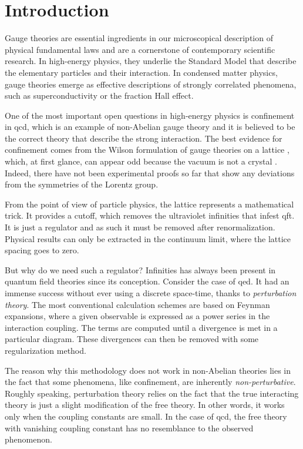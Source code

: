 \newpage

\chapter*{Introduction}
\label{chap:introduction}

Gauge theories are essential ingredients in our microscopical description of physical fundamental laws and are a cornerstone of contemporary scientific research.
In high-energy physics, they underlie the Standard Model that describe the elementary particles and their interaction.
In condensed matter physics, gauge theories emerge as effective descriptions of strongly correlated phenomena, such as superconductivity or the fraction Hall effect.

One of the most important open questions in high-energy physics is confinement in \ac{qcd}, which is an example of non-Abelian gauge theory and it is believed to be the correct theory that describe the strong interaction.
The best evidence for confinement comes from the Wilson formulation of gauge theories on a lattice \cite{wilson1974confinement}, which, at first glance, can appear odd because the vacuum is not a crystal \cite{creutz1985book}.
Indeed, there have not been experimental proofs so far that show any deviations from the symmetries of the Lorentz group.

From the point of view of particle physics, the lattice represents a mathematical trick.
It provides a cutoff, which removes the ultraviolet infinities that infest \ac{qft}.
It is just a regulator and as such it must be removed after renormalization.
Physical results can only be extracted in the continuum limit, where the lattice spacing goes to zero.

But why do we need such a regulator?
Infinities has always been present in quantum field theories since its conception.
Consider the case of \ac{qed}.
It had an immense success without ever using a discrete space-time, thanks to \emph{perturbation theory}.
The most conventional calculation schemes are based on Feynman expansions,
where a given observable is expressed as a power series in the interaction coupling.
The terms are computed until a divergence is met in a particular diagram.
These divergences can then be removed with some regularization method.

The reason why this methodology does not work in non-Abelian theories lies in the fact that some phenomena, like confinement, are inherently \emph{non-perturbative}.
Roughly speaking, perturbation theory relies on the fact that the true interacting theory is just a slight modification of the free theory.
In other words, it works only when the coupling constants are small.
In the case of \ac{qcd}, the free theory with vanishing coupling constant has no resemblance to the observed phenomenon.


